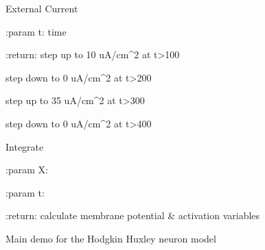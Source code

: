 \documentclass[letterpaper,10pt,english]{sphinxmanual}
\begin{document}
\begin{fulllineitems}

\begin{fulllineitems}
\label{_static/Hodgkin Huxley:Source.HodgkinHuxley.HodgkinHuxley.I_inj}
External Current

\begin{DUlineblock}{0em}
\item[] :param t: time
\item[] :return: step up to 10 uA/cm\textasciicircum{}2 at t\textgreater{}100
\item[]
\begin{DUlineblock}{\DUlineblockindent}
\item[] step down to 0 uA/cm\textasciicircum{}2 at t\textgreater{}200
\item[] step up to 35 uA/cm\textasciicircum{}2 at t\textgreater{}300
\item[] step down to 0 uA/cm\textasciicircum{}2 at t\textgreater{}400
\end{DUlineblock}
\end{DUlineblock}

\end{fulllineitems}


\begin{fulllineitems}
\label{_static/Hodgkin Huxley:Source.HodgkinHuxley.HodgkinHuxley.dALLdt}
Integrate

\begin{DUlineblock}{0em}
\item[] :param X:
\item[] :param t:
\item[] :return: calculate membrane potential \& activation variables
\end{DUlineblock}

\end{fulllineitems}


\begin{fulllineitems}
\label{_static/Hodgkin Huxley:Source.HodgkinHuxley.HodgkinHuxley.Main}
Main demo for the Hodgkin Huxley neuron model

\end{fulllineitems}


\end{fulllineitems}
\end{document}
